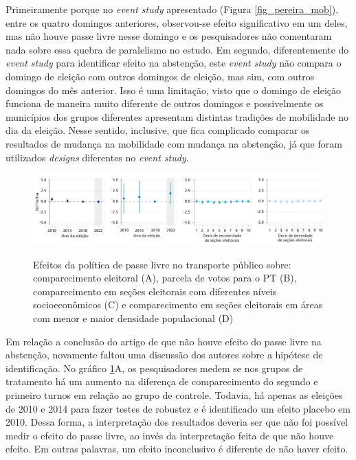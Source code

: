 Primeiramente porque no \textit{event study} apresentado (Figura \ref{fig_pereira_mob}), entre os quatro domingos anteriores, observou-se efeito significativo em um deles, mas não houve passe livre nesse domingo e os pesquisadores não comentaram nada sobre essa quebra de paralelismo no estudo. Em segundo, diferentemente do \textit{event study} para identificar efeito na abstenção, este \textit{event study} não compara o domingo de eleição com outros domingos de eleição, mas sim, com outros domingos do mês anterior. Isso é uma limitação, visto que o domingo de eleição funciona de maneira muito diferente de outros domingos e possivelmente os municípios dos grupos diferentes apresentam distintas tradições de mobilidade no dia da eleição. Nesse sentido, inclusive, que fica complicado comparar os resultados de mudança na mobilidade com mudança na abstenção, já que foram utilizados \textit{designs} diferentes no \textit{event study}.

\begin{figure}[!ht]
  \caption{Efeitos da política de passe livre no transporte público sobre: comparecimento eleitoral (A), parcela de votos para o PT (B), comparecimento em seções eleitorais com diferentes níveis socioeconômicos (C) e comparecimento em seções eleitorais em áreas com menor e maior densidade populacional (D)}
    \includegraphics[width = \linewidth]{relatorios/passe-livre/graficos/pereira_abst.png}
    \label{fig_pereira_abst}
\end{figure}

Em relação a conclusão do artigo de que não houve efeito do passe livre na abstenção, novamente faltou uma discussão dos autores sobre a hipótese de identificação. No gráfico \ref{fig_pereira_abst}A, os pesquisadores medem se nos grupos de tratamento há um aumento na diferença de comparecimento do segundo e primeiro turnos em relação ao grupo de controle. Todavia, há apenas as eleições de 2010 e 2014 para fazer testes de robustez e é identificado um efeito placebo em 2010. Dessa forma, a interpretação dos resultados deveria ser que não foi possível medir o efeito do passe livre, ao invés da interpretação feita de que não houve efeito. Em outras palavras, um efeito inconclusivo é diferente de não haver efeito.

